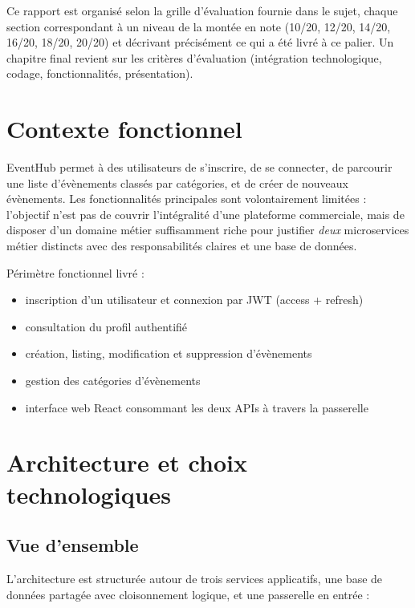 \documentclass[11pt,a4paper]{article}
\begin{document}
Ce rapport est organisé selon la grille d'évaluation fournie dans le sujet, chaque section correspondant à un niveau de la montée en note (10/20, 12/20, 14/20, 16/20, 18/20, 20/20) et décrivant précisément ce qui a été livré à ce palier. Un chapitre final revient sur les critères d'évaluation (intégration technologique, codage, fonctionnalités, présentation).

\section{Contexte fonctionnel}

EventHub permet à des utilisateurs de s'inscrire, de se connecter, de parcourir une liste d'évènements classés par catégories, et de créer de nouveaux évènements. Les fonctionnalités principales sont volontairement limitées : l'objectif n'est pas de couvrir l'intégralité d'une plateforme commerciale, mais de disposer d'un domaine métier suffisamment riche pour justifier \emph{deux} microservices métier distincts avec des responsabilités claires et une base de données.

Périmètre fonctionnel livré :
\begin{itemize}
    \item inscription d'un utilisateur et connexion par JWT (access + refresh)
    \item consultation du profil authentifié
    \item création, listing, modification et suppression d'évènements
    \item gestion des catégories d'évènements
    \item interface web React consommant les deux APIs à travers la passerelle
\end{itemize}

\section{Architecture et choix technologiques}

\subsection{Vue d'ensemble}

L'architecture est structurée autour de trois services applicatifs, une base de données partagée avec cloisonnement logique, et une passerelle en entrée :
\end{document}
